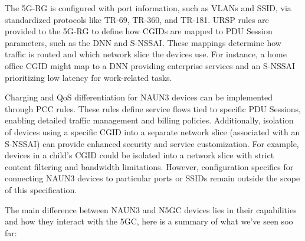 The \ac{5G-RG} is configured with port information, such as \acp{VLAN} and \ac{SSID}, via standardized protocols like TR-69, TR-360, and TR-181. \ac{URSP} rules are provided to the \ac{5G-RG} to define how \acp{CGID} are mapped to \ac{PDU} Session parameters, such as the \ac{DNN} and \ac{S-NSSAI}. These mappings determine how traffic is routed and which network slice the devices use. For instance, a home office \ac{CGID} might map to a \ac{DNN} providing enterprise services and an \ac{S-NSSAI} prioritizing low latency for work-related tasks.

Charging and \ac{QoS} differentiation for NAUN3 devices can be implemented through \ac{PCC} rules. These rules define service flows tied to specific \ac{PDU} Sessions, enabling detailed traffic management and billing policies. Additionally, isolation of devices using a specific \ac{CGID} into a separate network slice (associated with an \ac{S-NSSAI}) can provide enhanced security and service customization. For example, devices in a child’s \ac{CGID} could be isolated into a network slice with strict content filtering and bandwidth limitations. However, configuration specifics for connecting \ac{NAUN3} devices to particular ports or \acp{SSID} remain outside the scope of this specification.%

The main difference between \ac{NAUN3} and \ac{N5GC} devices lies in their capabilities and how they interact with the \ac{5GC}, here is a summary of what we've seen soo far:

